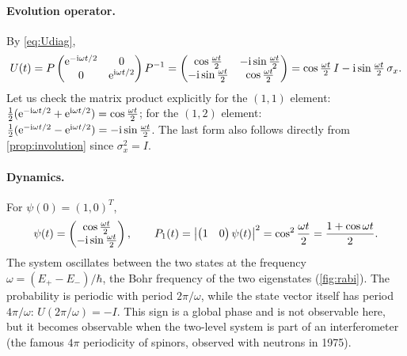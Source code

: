 \paragraph{Evolution operator.} By \cref{eq:Udiag},
\begin{equation}\label{eq:Usimple}
  U(t)=P\begin{pmatrix}\mathrm e^{-\mathrm i\omega t/2}&0\\0&\mathrm e^{\mathrm i\omega t/2}\end{pmatrix}P^{-1}
  =\begin{pmatrix}\cos\frac{\omega t}2&-\mathrm i\sin\frac{\omega t}2\\-\mathrm i\sin\frac{\omega t}2&\cos\frac{\omega t}2\end{pmatrix}
  =\cos\tfrac{\omega t}2\,I-\mathrm i\sin\tfrac{\omega t}2\,\sigma_x .
\end{equation}
Let us check the matrix product explicitly for the $(1,1)$ element: $\frac12(\mathrm e^{-\mathrm i\omega t/2}+\mathrm e^{\mathrm i\omega t/2})=\cos\frac{\omega t}2$;
for the $(1,2)$ element: $\frac12(\mathrm e^{-\mathrm i\omega t/2}-\mathrm e^{\mathrm i\omega t/2})=-\mathrm i\sin\frac{\omega t}2$. The last form also follows directly
from \cref{prop:involution} since $\sigma_x^2=I$.

\paragraph{Dynamics.} For $\psi(0)=(1,0)^T$,
\begin{equation}
  \psi(t)=\begin{pmatrix}\cos\frac{\omega t}2\\-\mathrm i\sin\frac{\omega t}2\end{pmatrix},\qquad
  P_1(t)=\left|\begin{pmatrix}1&0\end{pmatrix}\psi(t)\right|^2=\cos^2\frac{\omega t}2=\frac{1+\cos\omega t}2.
\end{equation}
The system oscillates between the two states at the frequency $\omega=(E_+-E_-)/\hbar$, the Bohr frequency of the
two eigenstates (\cref{fig:rabi}). The probability is periodic with period $2\pi/\omega$, while the state vector itself has period $4\pi/\omega$:
$U(2\pi/\omega)=-I$. This sign is a global phase and is not observable here, but it becomes observable when the two-level system is
part of an interferometer (the famous $4\pi$ periodicity of spinors, observed with neutrons in 1975).

